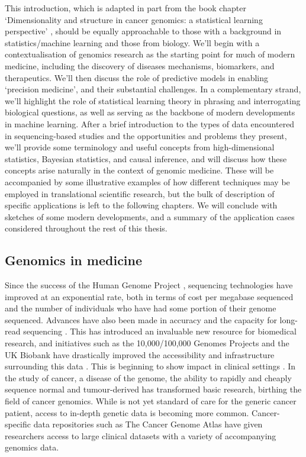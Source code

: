 \documentclass[thesis.tex]{subfiles}
\begin{document}
This introduction, which is adapted in part from the book chapter `Dimensionality and structure in cancer genomics: a statistical learning
perspective' \citep{bradley_dimensionality_2020}, should be equally approachable to those with a background in statistics/machine learning and those from biology. We'll begin with a contextualisation of genomics research as the starting point for much of modern medicine, including the discovery of diseases mechanisms, biomarkers, and therapeutics. We'll then discuss the role of predictive models in enabling `precision medicine', and their substantial challenges. In a complementary strand, we'll highlight the role of statistical learning theory in phrasing and interrogating biological questions, as well as serving as the backbone of modern developments in machine learning. After a brief introduction to the types of data encountered in sequencing-based studies and the opportunities and problems they present, we'll provide some terminology and useful concepts from high-dimensional statistics, Bayesian statistics, and causal inference, and will discuss how these concepts arise naturally in the context of genomic medicine. These will be accompanied by some illustrative examples of how different techniques may be employed in translational scientific research, but the bulk of description of specific applications is left to the following chapters. We will conclude with sketches of some modern developments, and a summary of the application cases considered throughout the rest of this thesis.

\subsection{Genomics in medicine}
Since the success of the Human Genome Project \citep{lander_initial_2001}, sequencing technologies
have improved at an exponential rate, both in terms of cost per megabase
sequenced \citep{wetterstrand_dna_2022} and the number of individuals who have had some portion of
their genome sequenced. Advances have also been made in accuracy and the capacity for long-read sequencing \citep{goldfeder_human_2017}. This has introduced an invaluable new resource
for biomedical research, and initiatives such as the 10,000/100,000 Genomes Projects \citep{telenti_deep_2016} and the UK Biobank \citep{bycroft_uk_2018} have drastically improved the accessibility and infrastructure surrounding this data \citep{szustakowski_advancing_2021}. This is beginning to show impact in clinical settings \citep{prokop_genome_2018}. In the study of cancer, a disease of the
genome, the ability to rapidly and cheaply sequence normal and tumour-derived  has transformed basic research, birthing the field of cancer
genomics. While  is not yet standard of care for the generic cancer patient,
access to in-depth genetic data is becoming more common. Cancer-specific data repositories such as The Cancer Genome Atlas \citep{weinstein_cancer_2013} have given
researchers access to large clinical datasets with a variety of accompanying
genomics data. 
\end{document}
